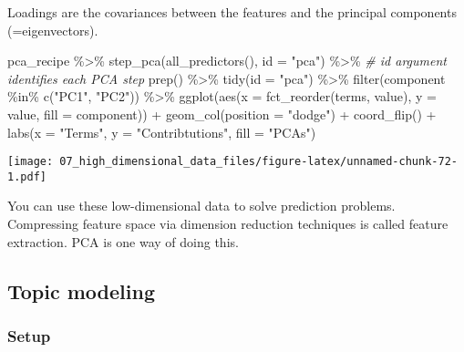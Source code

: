 \documentclass[
]{book}
\newenvironment{Shaded}{\begin{snugshade}}{\end{snugshade}}
\newcommand{\AttributeTok}[1]{\textcolor[rgb]{0.77,0.63,0.00}{#1}}
\newcommand{\CommentTok}[1]{\textcolor[rgb]{0.56,0.35,0.01}{\textit{#1}}}
\newcommand{\FunctionTok}[1]{\textcolor[rgb]{0.00,0.00,0.00}{#1}}
\newcommand{\NormalTok}[1]{#1}
\newcommand{\SpecialCharTok}[1]{\textcolor[rgb]{0.00,0.00,0.00}{#1}}
\newcommand{\StringTok}[1]{\textcolor[rgb]{0.31,0.60,0.02}{#1}}
\begin{document}
Loadings are the covariances between the features and the principal components (=eigenvectors).

\begin{Shaded}
\begin{Highlighting}[]
\NormalTok{pca\_recipe }\SpecialCharTok{\%\textgreater{}\%}
  \FunctionTok{step\_pca}\NormalTok{(}\FunctionTok{all\_predictors}\NormalTok{(), }
           \AttributeTok{id =} \StringTok{"pca"}\NormalTok{) }\SpecialCharTok{\%\textgreater{}\%} \CommentTok{\# id argument identifies each PCA step }
  \FunctionTok{prep}\NormalTok{() }\SpecialCharTok{\%\textgreater{}\%}
  \FunctionTok{tidy}\NormalTok{(}\AttributeTok{id =} \StringTok{"pca"}\NormalTok{) }\SpecialCharTok{\%\textgreater{}\%}
  \FunctionTok{filter}\NormalTok{(component }\SpecialCharTok{\%in\%} \FunctionTok{c}\NormalTok{(}\StringTok{"PC1"}\NormalTok{, }\StringTok{"PC2"}\NormalTok{)) }\SpecialCharTok{\%\textgreater{}\%}
  \FunctionTok{ggplot}\NormalTok{(}\FunctionTok{aes}\NormalTok{(}\AttributeTok{x =} \FunctionTok{fct\_reorder}\NormalTok{(terms, value), }\AttributeTok{y =}\NormalTok{ value, }
             \AttributeTok{fill =}\NormalTok{ component)) }\SpecialCharTok{+}
    \FunctionTok{geom\_col}\NormalTok{(}\AttributeTok{position =} \StringTok{"dodge"}\NormalTok{) }\SpecialCharTok{+}
    \FunctionTok{coord\_flip}\NormalTok{() }\SpecialCharTok{+}
    \FunctionTok{labs}\NormalTok{(}\AttributeTok{x =} \StringTok{"Terms"}\NormalTok{,}
         \AttributeTok{y =} \StringTok{"Contribtutions"}\NormalTok{,}
         \AttributeTok{fill =} \StringTok{"PCAs"}\NormalTok{) }
\end{Highlighting}
\end{Shaded}

\texttt{[image: 07\_high\_dimensional\_data\_files/figure-latex/unnamed-chunk-72-1.pdf]}

You can use these low-dimensional data to solve prediction problems. Compressing feature space via dimension reduction techniques is called feature extraction. PCA is one way of doing this.

\hypertarget{topic-modeling}{%
\subsection{Topic modeling}\label{topic-modeling}}

\hypertarget{setup-6}{%
\subsubsection{Setup}\label{setup-6}}
\end{document}
